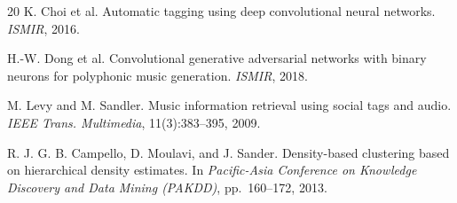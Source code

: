\documentclass{article}
\begin{document}
\begin{thebibliography}{20}
K. Choi et al.
\newblock Automatic tagging using deep convolutional neural networks.
\newblock \textit{ISMIR}, 2016.

H.-W. Dong et al.
\newblock Convolutional generative adversarial networks with binary neurons for polyphonic music generation.
\newblock \textit{ISMIR}, 2018.

M. Levy and M. Sandler.
\newblock Music information retrieval using social tags and audio.
\newblock \textit{IEEE Trans. Multimedia}, 11(3):383--395, 2009.

R. J. G. B. Campello, D. Moulavi, and J. Sander.
\newblock Density-based clustering based on hierarchical density estimates.
\newblock In \textit{Pacific-Asia Conference on Knowledge Discovery and Data Mining (PAKDD)}, pp.\ 160--172, 2013.

\end{thebibliography}
\end{document}
